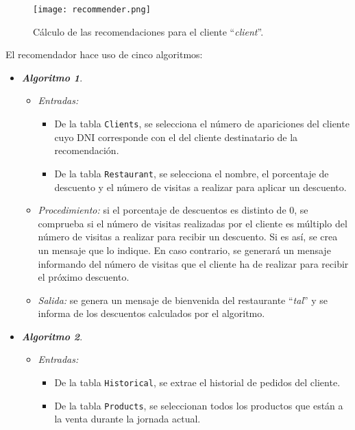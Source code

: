   \begin{figure}[H]
    \begin{center}
      \texttt{[image: recommender.png]}
      \caption{Cálculo de las recomendaciones para el cliente
      ``\emph{client}''.}
      \label{fig:recommender}
    \end{center}
  \end{figure}

El recomendador hace uso de cinco algoritmos:
\begin{itemize}
\item \textbf{\emph{Algoritmo 1}}.
  \begin{itemize}
  \item \emph{Entradas:}
    \begin{itemize}
    \item De la tabla \texttt{Clients}, se selecciona el número de apariciones 
    del cliente cuyo DNI corresponde con el del cliente destinatario de la
    recomendación.
    \item De la tabla \texttt{Restaurant}, se selecciona el nombre, el
    porcentaje de descuento y el número de visitas a realizar para aplicar un
    descuento.
    \end{itemize}
  \item \emph{Procedimiento:} si el porcentaje de descuentos es distinto de 0,
  se comprueba si el número de visitas realizadas por el cliente es múltiplo 
  del número de visitas a realizar para recibir un descuento. Si es así,
  se crea un mensaje que lo indique. En caso contrario, se generará un
  mensaje informando del número de visitas que el cliente ha de realizar para 
  recibir el próximo descuento.
  \item \emph{Salida:} se genera un mensaje de bienvenida del restaurante
  ``\emph{tal}'' y se informa de los descuentos calculados por el algoritmo.
  \end{itemize}
\item \textbf{\emph{Algoritmo 2}}.
  \begin{itemize}
  \item \emph{Entradas:}
    \begin{itemize}
    \item De la tabla \texttt{Historical}, se extrae el historial de pedidos
    del cliente.
    \item De la tabla \texttt{Products}, se seleccionan todos los productos
    que están a la venta durante la jornada actual.
    \end{itemize}

\end{itemize}
\end{itemize}
